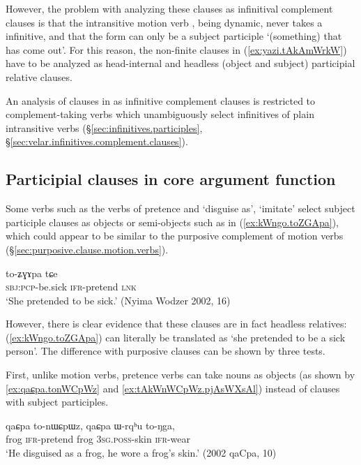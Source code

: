 However, the problem with analyzing these clauses as infinitival complement clauses is that the intransitive  motion verb , being dynamic, never takes a  infinitive, and that the form  can only be a subject participle `(something) that has come out'. For this reason, the non-finite clauses in (\ref{ex:yazi.tAkAmWrkW}) have to be analyzed as head-internal and headless (object and subject) participial relative clauses.

An analysis of clauses in  as infinitive complement clauses is restricted to complement-taking verbs which unambiguously select  infinitives of plain intransitive verbs (§\ref{sec:infinitives.participles}, §\ref{sec:velar.infinitives.complement.clauses}). 
 
\subsection{Participial clauses in core argument function} \label{sec:relative.pretence}
Some verbs such as the verbs of pretence  and  `disguise as', `imitate' select subject participle clauses as objects or semi-objects such as  in (\ref{ex:kWngo.toZGApa}), which could appear to be similar to the purposive complement of motion verbs (§\ref{sec:purposive.clause.motion.verbs}).

\begin{exe}
\ex \label{ex:kWngo.toZGApa}
\gll  [kɯ-ngo] to-ʑɣɤpa tɕe \\
\textsc{sbj}:\textsc{pcp}-be.sick \textsc{ifr}-pretend \textsc{lnk} \\
\glt `She pretended to be sick.' (Nyima Wodzer 2002, 16)
 \end{exe}

However, there is clear evidence that these clauses are in fact headless relatives: (\ref{ex:kWngo.toZGApa}) can literally be translated as `she pretended to be a sick person'. The difference with purposive clauses can be shown by three tests. 

First, unlike motion verbs, pretence verbs can take nouns as objects (as shown by \ref{ex:qaɕpa.tonWCpWz} and \ref{ex:tAkWnWCpWz.pjAsWXsAl}) instead of clauses with subject participles.  

\begin{exe}
\ex \label{ex:qaɕpa.tonWCpWz}
 \gll  qaɕpa to-nɯɕpɯz, qaɕpa ɯ-rqʰu to-ŋga, \\
frog \textsc{ifr}-pretend frog \textsc{3sg}.\textsc{poss}-skin \textsc{ifr}-wear \\
\glt `He disguised as a frog, he wore a frog's skin.' (2002 qaCpa, 10)
\end{exe}
 
